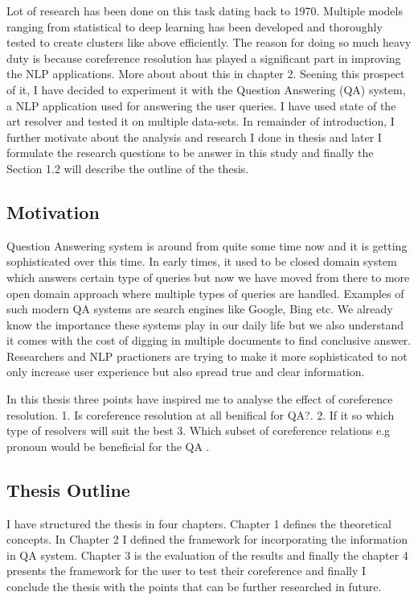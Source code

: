 \documentclass[11pt]{article}
\begin{document}
Lot of research has been done on this task dating back to 1970. Multiple models ranging from statistical to deep learning has been developed and thoroughly  tested to create clusters like above efficiently.  The reason for doing so much heavy duty is because coreference resolution has played a significant part in improving the NLP applications.  More about  about this in chapter 2. Seening this prospect of it, I have decided to experiment it with the Question Answering (QA) system, a NLP application used for answering the user queries. I have used state of the art resolver and tested it on multiple data-sets. In remainder of introduction, I further motivate about the analysis and research I done in thesis and later I formulate the research questions to be answer in this study and finally the Section 1.2 will describe the outline of the thesis.


\subsection{Motivation}
Question Answering system is around from quite some time now and it is getting sophisticated over this time.  In early times, it used to be closed domain system which answers certain type of queries but now we have moved from there to more open domain approach where multiple types of queries are handled. Examples of such modern QA systems are search engines like Google,  Bing etc.  We already know the importance these systems play in our daily life but we also understand it comes with the cost of digging in multiple documents to find conclusive answer. Researchers and NLP practioners are trying to make it more sophisticated to not only increase user experience but also spread true and clear information. 


In this thesis three points have inspired me to analyse the effect of coreference resolution. 1. Is coreference resolution at all benifical for QA?. 2. If it so which type of resolvers will suit the best 3. Which subset of coreference relations e.g pronoun would be beneficial for the QA .

\subsection{Thesis Outline}
I have structured the thesis in four chapters. Chapter 1 defines the theoretical concepts. In Chapter 2 I defined the framework for incorporating the information in QA system.  Chapter 3 is the evaluation of the results and finally the chapter 4 presents the framework for the user to test their coreference  and finally I conclude the thesis with the points that can be further researched in  future. 
\end{document}

